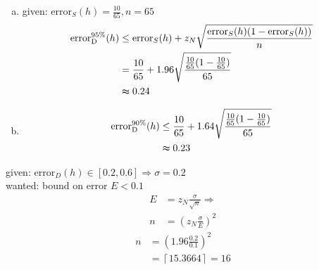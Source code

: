 \documentclass[10pt,a4paper,boxed]{hmcpset}
\begin{document}
	
		\begin{problem}
		\end{problem}

		\begin{solution}		
			\begin{enumerate}[(a)]
				\item given: $\textrm{error}_S(h) = \frac{10}{65}, n=65$
					\begin{align*}
						\textrm{error}_{\textrm{D}}^{95\%}(h) & \leq \textrm{error}_S(h) + z_N \sqrt{\frac{\textrm{error}_S(h)(1-\textrm{error}_S(h))}{n}}\\
															  & = \frac{10}{65} + 1.96 \sqrt{\frac{\frac{10}{65}(1-\frac{10}{65})}{65}}\\
															  & \thickapprox 0.24
					\end{align*}
					
				\item 
					\begin{align*}
						\textrm{error}_{\textrm{D}}^{90\%}(h) & \leq \frac{10}{65} + 1.64 					\sqrt{\frac{\frac{10}{65}(1-\frac{10}{65})}{65}}\\
															  & \thickapprox 0.23
					\end{align*}
									 			
			\end{enumerate}
			
		\end{solution}		

		\begin{problem}
		\end{problem}
		\begin{solution}
			given: $\textrm{error}_D(h) \in [0.2, 0.6] \Rightarrow \sigma = 0.2$\\
			wanted: bound on error $E<0.1$
			\begin{align*}
				E & = z_N \frac{\sigma}{\sqrt{n}} \Rightarrow \\
				n & = \left( z_N \frac{\sigma}{E} \right)^2
			\end{align*}
			\begin{align*}
				n & = \left( 1.96 \frac{0.2}{0.1} \right)^2 \\
				  & = \left\lceil 15.3664 \right\rceil = 16
			\end{align*}
		\end{solution}
		
		\begin{problem}[4. AUC]
				\end{problem}
		
\end{document}
